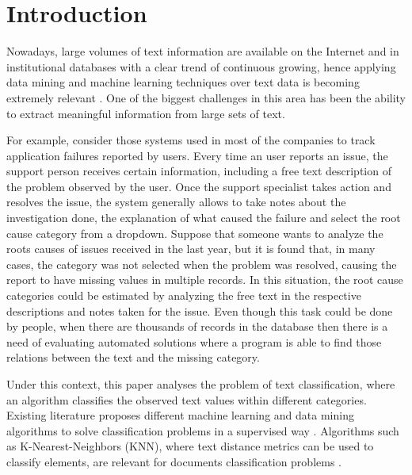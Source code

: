 \documentclass[preprint,12pt,3p]{elsarticle}
\begin{document}


\section{Introduction}
\label{introduction}


Nowadays, large volumes of text information are available on the Internet and in institutional databases with a clear trend of continuous growing, hence applying data mining and machine learning techniques over text data is becoming extremely relevant \cite{srivastava2009text}. One of the biggest challenges in this area has been the ability to extract meaningful information from large sets of text.\par

For example, consider those systems used in most of the companies to track application failures reported by users. Every time an user reports an issue, the support person receives certain information, including a free text description of the problem observed by the user. Once the support specialist takes action and resolves the issue, the system generally allows to take notes about the investigation done, the explanation of what caused the failure and select the root cause category from a dropdown. Suppose that someone wants to analyze the roots causes of issues received in the last year, but it is found that, in many cases, the category was not selected when the problem was resolved, causing the report to have missing values in multiple records. In this situation, the root cause categories could be estimated by analyzing the free text in the respective descriptions and notes taken for the issue. Even though this task could be done by people, when there are thousands of records in the database then there is a need of evaluating automated solutions where a program is able to find those relations between the text and the missing category.\par

Under this context, this paper analyses the problem of text classification, where an algorithm classifies the observed text values within different categories. Existing literature proposes different machine learning and data mining algorithms to solve classification problems in a supervised way \cite{tran2015multiple,truong2004learning, ishioka2014investigations}. Algorithms such as K-Nearest-Neighbors (KNN), where text distance metrics can be used to classify elements, are relevant for documents classification problems \cite{terzi2014text}.\par
\end{document}
